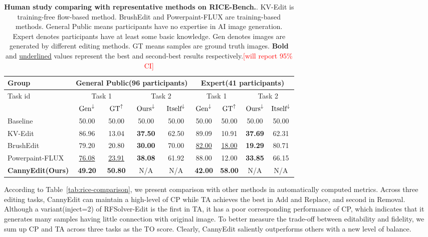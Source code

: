 \documentclass{article}
\begin{document}
\begin{table}[h]
\begin{center} 
\footnotesize
\setlength{\tabcolsep}{1.85mm} %
\caption{\textbf{Human study comparing with representative methods on RICE-Bench.}. KV-Edit is training-free flow-based method. BrushEdit and Powerpaint-FLUX are training-based methods. General Public means participants have no expertise in AI image generation. Expert denotes participants have at least some basic knowledge. Gen denotes images are generated by different editing methods. GT means samples are ground truth images. \textbf{Bold} and \underline{underlined} values represent the best and second-best results respectively.\textcolor{red}{[will report 95\% CI]}}
\begin{tabular}{l|cc|cc|cc|cc}
\toprule
\multirow{2}{*}[0.8ex]{Group} & \multicolumn{4}{c|}{General Public(96 participants)} & \multicolumn{4}{c}{Expert(41 participants)} \\
\midrule
\multirow{2}{*}[0.8ex]{Task id} & \multicolumn{2}{c|}{Task 1} & \multicolumn{2}{c|}{Task 2} &\multicolumn{2}{c|}{Task 1} & \multicolumn{2}{c}{Task 2}\\
\midrule
 Ratio regarded as AI(\%) & $\textup{Gen}^{\downarrow}$ & $\textup{GT}^{\uparrow}$ & $\textup{Ours}^{\downarrow}$ & $\textup{Itself}^{\downarrow}$ & $\textup{Gen}^{\downarrow}$ & $\textup{GT}^{\uparrow}$ & $\textup{Ours}^{\downarrow}$ & $\textup{Itself}^{\downarrow}$\\
\midrule
Baseline & 50.00  & 50.00 & 50.00 & 50.00 & 50.00 & 50.00 & 50.00 & 50.00\\
\midrule
KV-Edit~\cite{zhu2025kv} & 86.96  & 13.04 & \textbf{37.50} & 62.50 & 89.09 & 10.91 & \textbf{37.69} & 62.31\\
BrushEdit~\cite{li2024brushedit} & 79.20 & 20.80 & \textbf{30.00} & 70.00 & \underline{82.00} & \underline{18.00} & \textbf{19.29} & 80.71\\
Powerpaint-FLUX~\cite{zhuang2023task} & \underline{76.08} & \underline{23.91} & \textbf{38.08} & 61.92 & 88.00 & 12.00 & \textbf{33.85} & 66.15\\
\midrule
\textbf{CannyEdit(Ours)} & \textbf{49.20} & \textbf{50.80} & N/A & N/A & \textbf{42.00} & \textbf{58.00} & N/A & N/A\\
\bottomrule
\end{tabular}
\label{tab:rice-human-study} 
\end{center}
\end{table}


According to Table~\ref{tab:rice-comparison}, we present comparison with other methods in automatically computed metrics. Across three editing tasks, CannyEdit can maintain a high-level of CP while TA achieves the best in Add and Replace, and second in Removal. Although a variant(inject=2) of RFSolver-Edit is the first in TA, it has a poor corresponding performance of CP, which indicates that it generates many samples having little connection with original image. To better measure the trade-off between editability and fidelity, we sum up CP and TA across three tasks as the TO score. Clearly, CannyEdit saliently outperforms others with a new level of balance.
\end{document}
